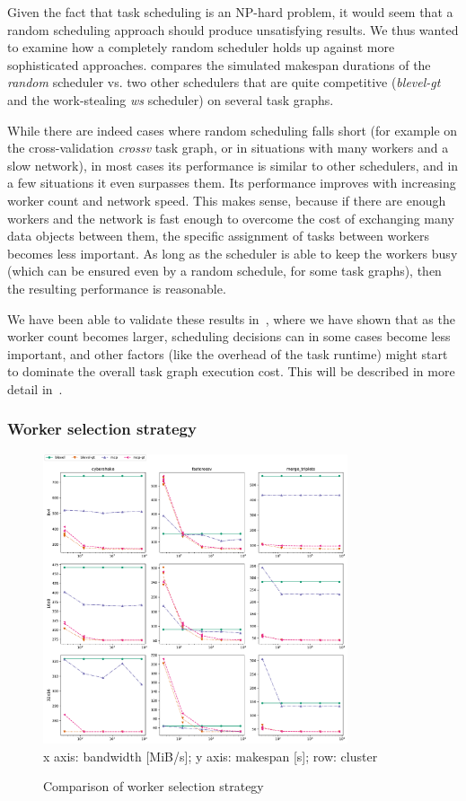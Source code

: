 Given the fact that task scheduling is an NP-hard problem, it would seem that a random scheduling
approach should produce unsatisfying results. We thus wanted to examine how a completely
random scheduler holds up against more sophisticated approaches.  compares
the simulated makespan durations of the \emph{random} scheduler vs. two other schedulers
that are quite competitive (\emph{blevel-gt} and the work-stealing \emph{ws}
scheduler) on several task graphs.

While there are indeed cases where random scheduling falls short (for example on the
cross-validation \emph{crossv} task graph, or in situations with many workers and a slow
network), in most cases its performance is similar to other schedulers, and in a few situations it
even surpasses them. Its performance improves with increasing worker count and network speed.
This makes sense, because if there are enough workers and the network is fast enough to overcome
the cost of exchanging many data objects between them, the specific assignment of tasks between
workers becomes less important. As long as the scheduler is able to keep the workers busy (which
can be ensured even by a random schedule, for some task graphs), then the resulting performance is
reasonable.

We have been able to validate these results in~\cite{rsds}, where we have shown that as
the worker count becomes larger, scheduling decisions can in some cases become less important, and
other factors (like the overhead of the task runtime) might start to dominate the overall
task graph execution cost. This will be described in more detail in~.

\subsubsection*{Worker selection strategy}

\begin{figure}
	\centering
	\includegraphics[width=0.8\textwidth]{imgs/estee/charts/gt-scheduler}\\
	{\small x axis: bandwidth [MiB/s]; y axis: makespan [s]; row: cluster}
	\caption{Comparison of worker selection strategy}
	\label{fig:estee-chart-gt-scheduler}
\end{figure}

